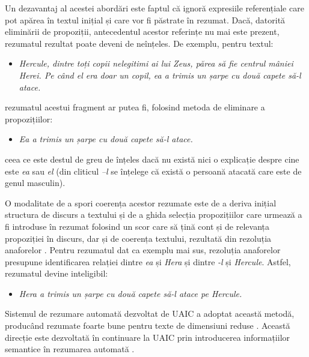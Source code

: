 \documentclass[]{../../metanetpaper}
\begin{document}
\begin{multicols}{2}
Un dezavantaj al acestei abordări este faptul că ignoră expresiile referențiale care pot apărea în textul inițial și care vor fi păstrate în rezumat. Dacă, datorită eliminării de propoziții, antecedentul acestor referințe nu mai este prezent, rezumatul rezultat poate deveni de neînțeles. De exemplu, pentru textul:

\begin{itemize}
\item\textit{Hercule, dintre toți copii nelegitimi ai lui Zeus, părea să fie centrul mâniei Herei. Pe când el era doar un copil, ea a trimis un șarpe cu două capete să-l atace.}
\end{itemize}

\noindent 
rezumatul acestui fragment ar putea fi, folosind metoda de eliminare a propozițiilor:

\begin{itemize}
\item\textit{Ea a trimis un șarpe cu două capete să-l atace.}
\end{itemize}

\noindent
ceea ce este destul de greu de înțeles dacă nu există nici o explicație despre cine este \textit{ea} sau \textit{el} (din cliticul 
\textit{–l} se înțelege că există o persoană atacată care este de genul masculin).

O modalitate de a spori coerența acestor rezumate este de a deriva inițial structura de discurs a textului și de a ghida selecția propozițiilor care urmează a fi introduse în rezumat folosind un scor care să țină cont și de relevanța propoziției în discurs, dar și de coerența textului, rezultată din rezoluția anaforelor \cite{cristea1}. Pentru rezumatul dat ca exemplu mai sus, rezoluția anaforelor presupune identificarea relației dintre \textit{ea} și \textit{Hera} și dintre \textit{-l} și \textit{Hercule}. Astfel, rezumatul devine inteligibil:

\begin{itemize}
\item\textit{Hera a trimis un șarpe cu două capete să-l atace pe Hercule.}
\end{itemize}

Sistemul de rezumare automată dezvoltat de UAIC a adoptat această metodă, producând rezumate foarte bune pentru texte de dimensiuni reduse \cite{cristea2}. Această direcție este dezvoltată în continuare la UAIC prin introducerea informațiilor semantice în rezumarea automată \cite{trandabatRez}.


\end{multicols}
\end{document}
